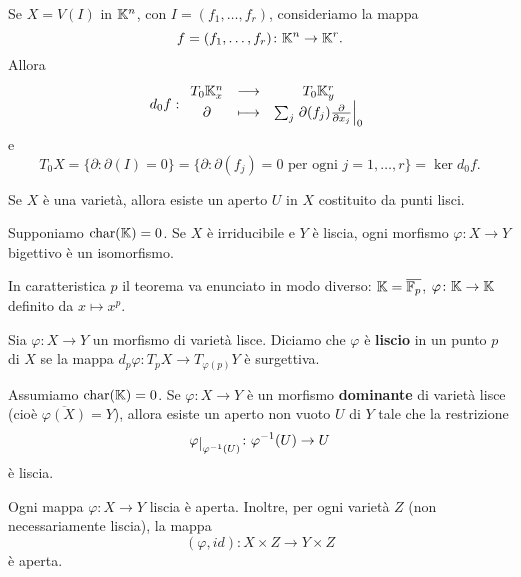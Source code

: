 \begin{example}
    Se $X=V(I)$ in $\mathbb{K}^n$, con $I=(f_1,\ldots,f_r)$, consideriamo la mappa \[f=(f_1,\ldots,f_r)\colon \mathbb{K}^n \to \mathbb{K}^r.\] Allora 
    \[d_0f:\begin{array}{ccc} {T_0 \mathbb{K}^n_x} & \longrightarrow & {T_0 \mathbb{K}^r_y}\\ {\partial} & \longmapsto & {\sum_j \left.\partial(f_j)\frac{\partial}{\partial x_j}\right\lvert_0} \end{array}\]
    e \[T_0 X=\{\partial\colon \partial(I)=0\}=\{\partial\colon \partial(f_j)=0 \text{ per ogni }j=1,\ldots,r\}=\ker d_0f.\]
\end{example}

\begin{theorem}
    Se $X$ è una varietà, allora esiste un aperto $U$ in $X$ costituito da punti lisci.
\end{theorem}



\begin{theorem}[Zariski]\label{ThZariski}
Supponiamo $\operatorname{char}(\mathbb{K})=0$. Se $X$ \`e irriducibile e $Y$ \`e liscia, ogni morfismo $\varphi\colon X\to Y$ bigettivo è un isomorfismo.    
\end{theorem}

In caratteristica $p$ il teorema va enunciato in modo diverso: $\mathbb{K}=\overline{\mathbb{F}_p}$, $\varphi\colon \mathbb{K} \to \mathbb{K}$ definito da $x\mapsto x^p$.


\begin{definition}
    Sia $\varphi\colon X\to Y$ un morfismo di varietà lisce. Diciamo che $\varphi$ è \textbf{liscio} in un punto $p$ di $X$ se la mappa $d_p\varphi\colon T_pX\to T_{\varphi(p)}Y$ è surgettiva.
\end{definition}

\begin{theorem}\label{ThMorfismoDominanteTraLisceHaRestrizioneLisciaSuAperto}
    Assumiamo $\operatorname{char}(\mathbb{K})=0$. Se $\varphi\colon X\to Y$ è un morfismo \textbf{dominante} di varietà lisce (cioè $\overline{\varphi(X)}=Y$), allora esiste un aperto non vuoto $U$ di $Y$ tale che la restrizione \[\varphi\res{\varphi^{-1}(U)}\colon \varphi^{-1}(U) \to U\] è liscia.
\end{theorem}

\begin{theorem}\label{ThMappaLisciaEAperta}
    Ogni mappa $\varphi\colon X \to Y$ liscia è aperta. Inoltre, per ogni varietà $Z$ (non necessariamente liscia), la mappa \[(\varphi,id)\colon X\times Z \to Y\times Z\] è aperta.
\end{theorem}

